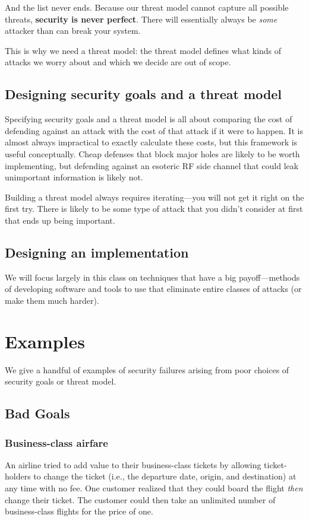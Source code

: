 And the list never ends. Because our threat model cannot capture all
possible threats, \textbf{security is never perfect}.
There will essentially always be \textit{some} attacker than can break your system.

This is why we need a threat model: the threat
model defines what kinds of attacks we worry about
and which we decide are out of scope.

\subsection{Designing security goals and a threat model}
Specifying security goals and
a threat model is all about comparing
the cost of defending against an attack with the
cost of that attack if it were to happen.
It is almost always impractical to exactly calculate
these costs, but this framework is useful
conceptually.
Cheap defenses that block major
holes are likely to be worth implementing, but
defending against an esoteric RF side channel that
could leak unimportant information is likely not.

Building a threat model always requires iterating---you will not get it right on the first try.
There is likely to be some type of attack that you didn't consider at first that ends up being important.

\subsection{Designing an implementation}
We will focus largely in this class on techniques
that have a big payoff---methods of developing
software and tools to use that eliminate entire
classes of attacks (or make them much harder). 

\section{Examples}

We give a handful of examples of security failures arising from poor
choices of security goals or threat model.

\subsection{Bad Goals}
\subsubsection{Business-class airfare}
An airline tried to add value to their
business-class tickets by allowing ticket-holders to 
change the ticket (i.e., the departure date, origin, and destination)
at any time with no fee.
One customer realized that they could board the flight
\textit{then} change their ticket.
The customer could then take an unlimited number of
business-class flights for the price of one.

